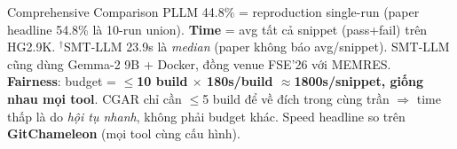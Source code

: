 \documentclass[aspectratio=169,10pt]{beamer}
\begin{document}
\begin{frame}{Comprehensive Comparison}
\vspace{0.5em}
\tiny PLLM 44.8\% = reproduction single-run (paper headline 54.8\% là 10-run union). \textbf{Time} = avg tất cả snippet (pass+fail) trên HG2.9K. $^{\dagger}$SMT-LLM 23.9s là \emph{median} (paper không báo avg/snippet). SMT-LLM cũng dùng Gemma-2 9B + Docker, đồng venue FSE'26 với MEMRES.\\
\textcolor{mDarkTeal}{\textbf{Fairness}: budget = \textbf{$\le$10 build $\times$ 180s/build $\approx$1800s/snippet, giống nhau mọi tool}. CGAR chỉ cần $\le$5 build để về đích trong cùng trần $\Rightarrow$ time thấp là do \emph{hội tụ nhanh}, không phải budget khác. Speed headline so trên \textbf{GitChameleon} (mọi tool cùng cấu hình).}
\end{frame}

\end{document}
